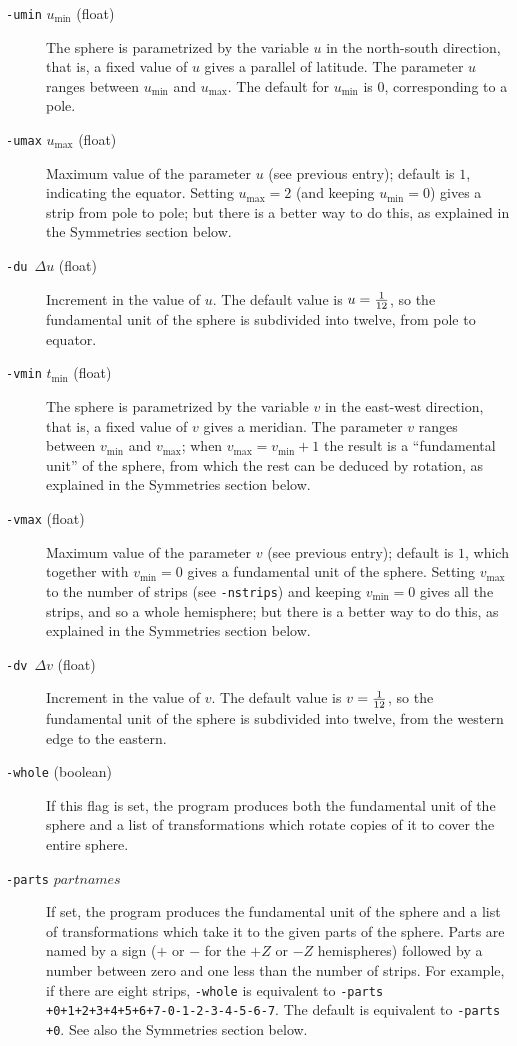 \begin{description}
\item[{\tt-umin} $u_{\min}$ (float)]
The sphere is parametrized by the variable $u$ in the north-south
direction, that is, a fixed value of $u$ gives a parallel of latitude.
The parameter $u$ ranges between $u_{\min}$ and $u_{\max}$.  The default
for $u_{\min}$ is 0, corresponding to a pole.

\item[{\tt-umax} $u_{\max}$ (float)]
Maximum value of the parameter $u$ (see previous entry); default is
$1$, indicating the equator.  Setting $u_{\max}=2$ (and keeping
$u_{\min}=0$) gives a strip from pole to pole; but there is a better way
to do this, as explained in the Symmetries section below.

\item[{\tt-du} $\,\Delta u$ (float)]
Increment in the value of $u$.  The default value is $u={1\over12}$,
so the fundamental unit of the sphere is subdivided into twelve, from
pole to equator.

\item[{\tt-vmin} $t_{\min}$ (float)]
The sphere is parametrized by the variable $v$ in the east-west
direction, that is, a fixed value of $v$ gives a meridian.  The
parameter $v$ ranges between $v_{\min}$ and $v_{\max}$; when
$v_{\max}=v_{\min}+1$ the result is a ``fundamental unit'' of the sphere,
from which the rest can be deduced by rotation, as explained in the
Symmetries section below.

\item[{\tt-vmax} (float)]
Maximum value of the parameter $v$ (see previous entry); default is
$1$, which together with $v_{\min}=0$ gives a fundamental unit of the
sphere.  Setting $v_{\max}$ to the number of strips (see {\tt-nstrips})
and keeping $v_{\min}=0$ gives all the strips, and so a whole
hemisphere; but there is a better way to do this, as explained in the
Symmetries section below.

\item[{\tt-dv} $\,\Delta v$ (float)]
Increment in the value of $v$.  The default value is $v={1\over12}$,
so the fundamental unit of the sphere is subdivided into twelve, from
the western edge to the eastern.

\item[{\tt-whole} (boolean)]
If this flag is set, the program produces both the fundamental unit of
the sphere and a list of transformations which rotate copies of it to
cover the entire sphere.

\item[{\tt-parts} $partnames$]
If set, the program produces the fundamental unit of the sphere and
a list of transformations which take it to the given parts of the sphere.
Parts are named by a sign ($+$ or $-$ for the $+Z$ or $-Z$ hemispheres)
followed by a number between zero and one less than the number of strips.
For example, if there are eight strips, {\tt -whole} is equivalent to
{\tt -parts +0+1+2+3+4+5+6+7-0-1-2-3-4-5-6-7}.  The default is equivalent to
{\tt -parts +0}.  See also the Symmetries section below.


\end{description}
